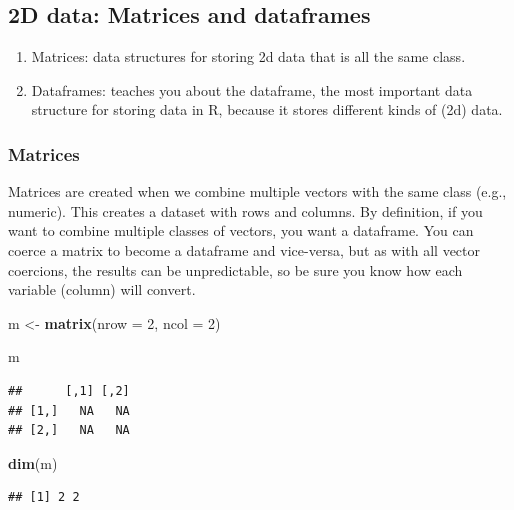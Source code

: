 \documentclass[
]{book}
\newenvironment{Shaded}{\begin{snugshade}}{\end{snugshade}}
\newcommand{\AttributeTok}[1]{\textcolor[rgb]{0.13,0.29,0.53}{#1}}
\newcommand{\DecValTok}[1]{\textcolor[rgb]{0.00,0.00,0.81}{#1}}
\newcommand{\FunctionTok}[1]{\textcolor[rgb]{0.13,0.29,0.53}{\textbf{#1}}}
\newcommand{\NormalTok}[1]{#1}
\newcommand{\OtherTok}[1]{\textcolor[rgb]{0.56,0.35,0.01}{#1}}
\providecommand{\tightlist}{%
  \setlength{\itemsep}{0pt}\setlength{\parskip}{0pt}}
\begin{document}
\subsection{2D data: Matrices and dataframes}\label{d-data-matrices-and-dataframes}

\begin{enumerate}
\def\labelenumi{\arabic{enumi}.}
\tightlist
\item
  Matrices: data structures for storing 2d data that is all the same class.
\item
  Dataframes: teaches you about the dataframe, the most important data structure for storing data in R, because it stores different kinds of (2d) data.
\end{enumerate}

\subsubsection{Matrices}\label{matrices}

Matrices are created when we combine multiple vectors with the same class (e.g., numeric). This creates a dataset with rows and columns. By definition, if you want to combine multiple classes of vectors, you want a dataframe. You can coerce a matrix to become a dataframe and vice-versa, but as with all vector coercions, the results can be unpredictable, so be sure you know how each variable (column) will convert.

\begin{Shaded}
\begin{Highlighting}[]
\NormalTok{m }\OtherTok{\textless{}{-}} \FunctionTok{matrix}\NormalTok{(}\AttributeTok{nrow =} \DecValTok{2}\NormalTok{, }\AttributeTok{ncol =} \DecValTok{2}\NormalTok{)}

\NormalTok{m}
\end{Highlighting}
\end{Shaded}

\begin{verbatim}
##      [,1] [,2]
## [1,]   NA   NA
## [2,]   NA   NA
\end{verbatim}

\begin{Shaded}
\begin{Highlighting}[]
\FunctionTok{dim}\NormalTok{(m)}
\end{Highlighting}
\end{Shaded}

\begin{verbatim}
## [1] 2 2
\end{verbatim}
\end{document}
